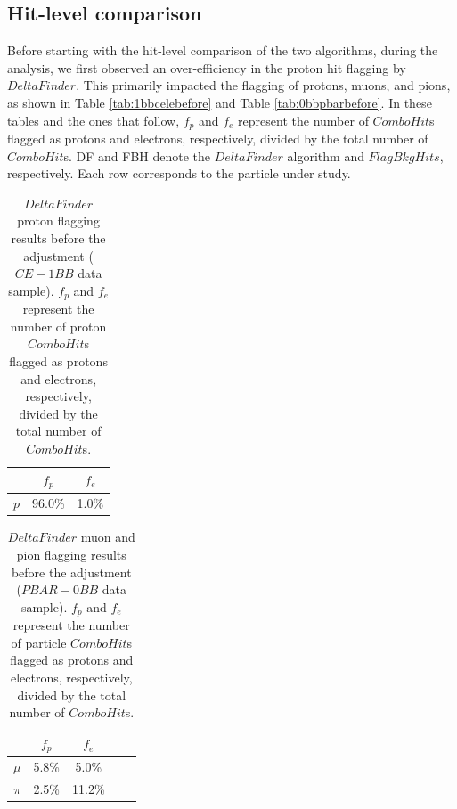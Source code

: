 \subsection{Hit-level comparison}
Before starting with the hit-level comparison of the two algorithms, during the analysis, 
we first observed an over-efficiency in the proton hit flagging by $DeltaFinder$. 
This primarily impacted the flagging of protons, muons, and pions, as shown in 
Table \ref{tab:1bbcelebefore} and Table \ref{tab:0bbpbarbefore}. In these tables 
and the ones that follow, $f_p$ and $f_e$ represent 
the number of $ComboHit$s flagged as protons and electrons, respectively, 
divided by the total number of $ComboHit$s. DF and FBH denote the $DeltaFinder$ 
algorithm and $FlagBkgHits$, respectively. Each row corresponds to the particle 
under study.
\begin{center}
    \begin{table}[h!]
    \centering
    \renewcommand{\arraystretch}{1.}
    \begin{tabular}{| c | c | c |} 
    \hline
    & $f_{p}$ & $f_{e}$ \\
    \hline
    $p$     & 96.0\% & 1.0\% \\
    \hline
    \end{tabular}
    \caption[$DeltaFinder$ proton flagging results before the adjustment.]{$DeltaFinder$ proton 
    flagging results before the adjustment ($CE-1BB$ data sample). $f_p$ and $f_e$ represent 
    the number of proton $ComboHit$s flagged as protons and electrons, respectively, 
    divided by the total number of $ComboHit$s.}
    \end{table}\label{tab:1bbcelebefore}
\end{center}
    
\begin{center}
    \begin{table}[h!]
        \centering
        \renewcommand{\arraystretch}{1.}
        \begin{tabular}{| c | c | c | c | c|} 
        \hline
        &   $f_{p}$ &   $f_{e}$\\
        \hline
        $\mu$ &  5.8\%  & 5.0\%\\
        \hline
        $\pi$ & 2.5\% &  11.2\%\\
        \hline
        \end{tabular}
        \caption[$DeltaFinder$ muon and pion flagging results before the adjustment.]{$DeltaFinder$ muon 
        and pion flagging results before the adjustment ($PBAR-0BB$ data sample). $f_p$ and $f_e$ represent 
        the number of particle $ComboHit$s flagged as protons and electrons, respectively, 
        divided by the total number of $ComboHit$s.}
    \end{table}\label{tab:0bbpbarbefore}
\end{center}

